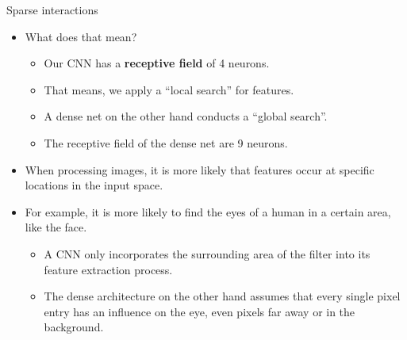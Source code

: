\documentclass[11pt,compress,t,notes=noshow, xcolor=table]{beamer}
\begin{document}
\begin{frame}{Sparse interactions}
  \begin{itemize}
    \item What does that mean?
    \begin{itemize}
      \item Our CNN has a \textbf{receptive field} of 4 neurons.
      \item That means, we apply a \enquote{local search} for features.
      \item A dense net on the other hand conducts a \enquote{global search}.
      \item The receptive field of the dense net are 9 neurons.
    \end{itemize}
    \item When processing images, it is more likely that features occur at specific locations in the input space.
    \item For example, it is more likely to find the eyes of a human in a certain area, like the face.
    \begin{itemize}
      \item A CNN only incorporates the surrounding area of the filter into its feature extraction process.
      \item The dense architecture on the other hand assumes that every single pixel entry has an influence on the eye, even pixels far away or in the background.
    \end{itemize}
  \end{itemize}
\end{frame}
\end{document}

